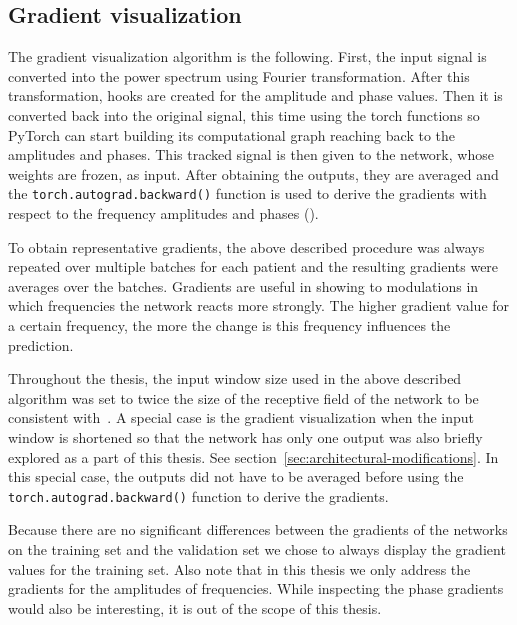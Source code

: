 \subsection{Gradient visualization}\label{subsec:gradinet-visualization}
The gradient visualization algorithm is the following.
First, the input signal is converted into the power spectrum using Fourier transformation.
After this transformation, hooks are created for the amplitude and phase values.
Then it is converted back into the original signal, this time using the torch functions so PyTorch can start building its computational graph reaching back to the amplitudes and phases.
This tracked signal is then given to the network, whose weights are frozen, as input.
After obtaining the outputs, they are averaged and the \texttt{torch.autograd.backward()} function is used to derive the gradients with respect to the frequency amplitudes and phases (\cite{gradient-visualization}).

To obtain representative gradients, the above described procedure was always repeated over multiple batches for each patient and the resulting gradients were averages over the batches.
Gradients are useful in showing to modulations in which frequencies the network reacts more strongly.
The higher gradient value for a certain frequency, the more the change is this frequency influences the prediction.

Throughout the thesis, the input window size used in the above described algorithm was set to twice the size of the receptive field of the network to be consistent with~\cite{Hammer-2021}.
A special case is the gradient visualization when the input window is shortened so that the network has only one output was also briefly explored as a part of this thesis.
See section~\ref{sec:architectural-modifications}.
In this special case, the outputs did not have to be averaged before using the \texttt{torch.autograd.backward()} function to derive the gradients.
 
Because there are no significant differences between the gradients of the networks on the training set and the validation set we chose to always display the gradient values for the training set.
Also note that in this thesis we only address the gradients for the amplitudes of frequencies.
While inspecting the phase gradients would also be interesting, it is out of the scope of this thesis.

